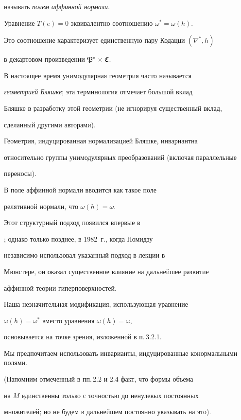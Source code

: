 называть {\it полем аффинной нормали}.


Уравнение $T(e) = 0$ эквивалентно соотношению $\omega^* = \omega (h)$.


Это соотношение характеризует единственную пару Кодацци $(\nabla^*, h)$


в декартовом произведении $\frak P^* \times \frak C$.


В настоящее время унимодулярная геометрия часто называется


{\it геометрией Бляшке}; эта терминология отмечает большой вклад


Бляшке в разработку этой геометрии (не игнорируя существенный вклад,


сделанный другими авторами).


Геометрия, индуцированная нормализацией Бляшке, инвариантна


относительно группы унимодулярных преобразований (включая параллельные


переносы).





В \cite{NOM-SA} поле аффинной нормали вводится как такое поле


релятивной нормали, что $\omega (h) = \omega$.


Этот структурный подход появился впервые в 


\cite{FLA}; однако только позднее, в 1982~г., когда Номидзу


независимо использовал указанный подход в лекции в


Мюнстере, он оказал существенное влияние на дальнейшее развитие


аффинной теории гиперповерхностей.


Наша незначительная модификация, использующая уравнение


$\omega (h) = \omega^*$ вместо уравнения $\omega (h) = \omega$,


основывается на точке зрения, изложенной в п.\,3.2.1.


Мы предпочитаем использовать инварианты, индуцированные конормальными полями.


(Напомним отмеченный в пп.\,2.2 и 2.4 факт, что формы объема


на $M$ единственны только с точностью до ненулевых постоянных


множителей; но не будем в дальнейшем постоянно указывать на это).


\smallskip





